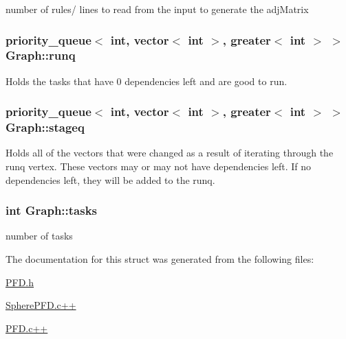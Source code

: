 number of rules/ lines to read from the input to generate the adj\-Matrix 

\hypertarget{structGraph_af6491f1c520f1cbff611984f0da0167a}{
\subsubsection[{runq}]{\setlength{\rightskip}{0pt plus 5cm}priority\-\_\-queue$<$ int, vector$<$ int $>$, greater$<$ int $>$ $>$ {\bf \-Graph\-::runq}}}\label{structGraph_af6491f1c520f1cbff611984f0da0167a}


\-Holds the tasks that have 0 dependencies left and are good to run. 

\hypertarget{structGraph_a8e75929d511a2d1808f89b7a899c6f12}{
\subsubsection[{stageq}]{\setlength{\rightskip}{0pt plus 5cm}priority\-\_\-queue$<$ int, vector$<$ int $>$, greater$<$ int $>$ $>$ {\bf \-Graph\-::stageq}}}\label{structGraph_a8e75929d511a2d1808f89b7a899c6f12}


\-Holds all of the vectors that were changed as a result of iterating through the runq vertex. \-These vectors may or may not have dependencies left. \-If no dependencies left, they will be added to the runq. 

\hypertarget{structGraph_a4d2a4b0944a121f0415137f0f1538e4a}{
\subsubsection[{tasks}]{\setlength{\rightskip}{0pt plus 5cm}int {\bf \-Graph\-::tasks}}}\label{structGraph_a4d2a4b0944a121f0415137f0f1538e4a}


number of tasks 



\-The documentation for this struct was generated from the following files\-:\begin{DoxyCompactItemize}
\item 
\hyperlink{PFD_8h}{\-P\-F\-D.\-h}\item 
\hyperlink{SpherePFD_8c_09_09}{\-Sphere\-P\-F\-D.\-c++}\item 
\hyperlink{PFD_8c_09_09}{\-P\-F\-D.\-c++}\end{DoxyCompactItemize}
